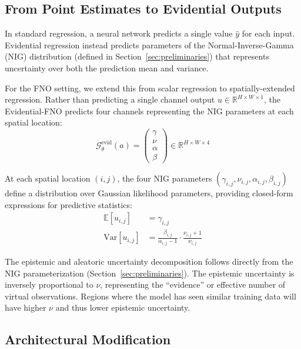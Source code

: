 \subsection{From Point Estimates to Evidential Outputs}

In standard regression, a neural network predicts a single value $\hat{y}$ for each input. Evidential 
regression instead predicts parameters of the Normal-Inverse-Gamma (NIG) distribution 
(defined in Section~\ref{sec:preliminaries}) that represents uncertainty over both the prediction mean and variance.

For the FNO setting, we extend this from scalar regression to spatially-extended regression. Rather than 
predicting a single channel output $u \in \mathbb{R}^{H \times W \times 1}$, the Evidential-FNO predicts four 
channels representing the NIG parameters at each spatial location:
\begin{equation}
    \mathcal{G}^{\text{evid}}_\theta(a) = \begin{pmatrix} \gamma \\ \nu \\ \alpha \\ \beta \end{pmatrix} \in \mathbb{R}^{H \times W \times 4}
\end{equation}

At each spatial location $(i,j)$, the four NIG parameters $(\gamma_{i,j}, \nu_{i,j}, \alpha_{i,j}, \beta_{i,j})$ 
define a distribution over Gaussian likelihood parameters, providing closed-form expressions for predictive 
statistics:
\begin{align}
    \mathbb{E}[u_{i,j}] &= \gamma_{i,j} \label{eq:pred_mean} \\
    \text{Var}[u_{i,j}] &= \frac{\beta_{i,j}}{\alpha_{i,j} - 1} \cdot \frac{\nu_{i,j} + 1}{\nu_{i,j}} \label{eq:pred_var}
\end{align}

The epistemic and aleatoric uncertainty decomposition follows directly from the NIG parameterization 
(Section~\ref{sec:preliminaries}). The epistemic uncertainty is inversely proportional to $\nu$, representing 
the ``evidence'' or effective number of virtual observations. Regions where the model has seen similar training 
data will have higher $\nu$ and thus lower epistemic uncertainty.

\subsection{Architectural Modification}

